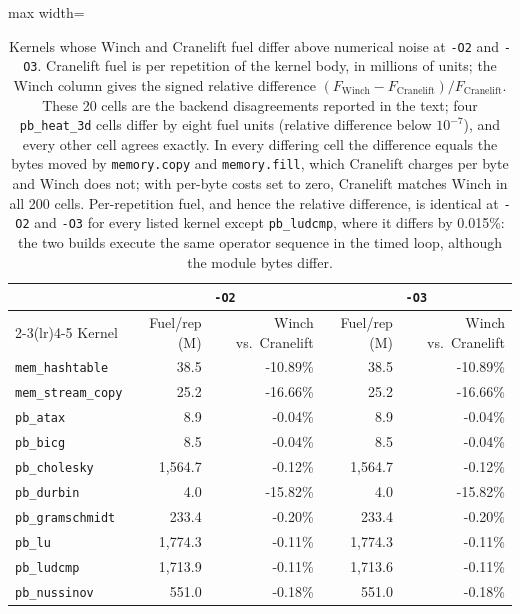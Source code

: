 \begin{table}[t]
\caption{Kernels whose Winch and Cranelift fuel differ above numerical noise at \texttt{-O2} and \texttt{-O3}. Cranelift fuel is per repetition of the kernel body, in millions of units; the Winch column gives the signed relative difference $(F_{\mathrm{Winch}}-F_{\mathrm{Cranelift}})/F_{\mathrm{Cranelift}}$. These 20 cells are the backend disagreements reported in the text; four \texttt{pb\_heat\_3d} cells differ by eight fuel units (relative difference below $10^{-7}$), and every other cell agrees exactly. In every differing cell the difference equals the bytes moved by \texttt{memory.copy} and \texttt{memory.fill}, which Cranelift charges per byte and Winch does not; with per-byte costs set to zero, Cranelift matches Winch in all 200 cells. Per-repetition fuel, and hence the relative difference, is identical at \texttt{-O2} and \texttt{-O3} for every listed kernel except \texttt{pb\_ludcmp}, where it differs by 0.015\%: the two builds execute the same operator sequence in the timed loop, although the module bytes differ.}\label{tab:backend_disagreement}
\footnotesize
\setlength{\tabcolsep}{4pt}%
\begin{adjustbox}{max width=\textwidth}%
\begin{tabular}{lrrrr}
\toprule
 & \multicolumn{2}{c}{\texttt{-O2}} & \multicolumn{2}{c}{\texttt{-O3}} \\
\cmidrule(lr){2-3}\cmidrule(lr){4-5}
Kernel & Fuel/rep (M) & Winch vs.\ Cranelift & Fuel/rep (M) & Winch vs.\ Cranelift \\
\midrule
\texttt{mem\_hashtable} & 38.5 & -10.89\% & 38.5 & -10.89\% \\
\texttt{mem\_stream\_copy} & 25.2 & -16.66\% & 25.2 & -16.66\% \\
\texttt{pb\_atax} & 8.9 & -0.04\% & 8.9 & -0.04\% \\
\texttt{pb\_bicg} & 8.5 & -0.04\% & 8.5 & -0.04\% \\
\texttt{pb\_cholesky} & 1,564.7 & -0.12\% & 1,564.7 & -0.12\% \\
\texttt{pb\_durbin} & 4.0 & -15.82\% & 4.0 & -15.82\% \\
\texttt{pb\_gramschmidt} & 233.4 & -0.20\% & 233.4 & -0.20\% \\
\texttt{pb\_lu} & 1,774.3 & -0.11\% & 1,774.3 & -0.11\% \\
\texttt{pb\_ludcmp} & 1,713.9 & -0.11\% & 1,713.6 & -0.11\% \\
\texttt{pb\_nussinov} & 551.0 & -0.18\% & 551.0 & -0.18\% \\
\bottomrule
\end{tabular}%
\end{adjustbox}
\end{table}
